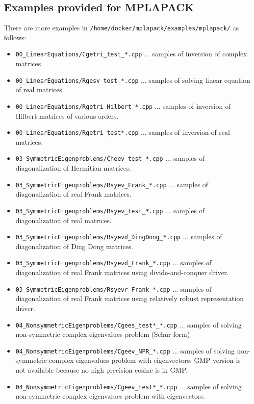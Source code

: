 \documentclass[12pt]{article}
\begin{document}
\subsection{Examples provided for MPLAPACK}
There are more examples in {\tt /home/docker/mplapack/examples/mplapack/} as follows:
\begin{itemize}
\item {\tt 00\_LinearEquations/Cgetri\_test\_*.cpp} ... samples of inversion of complex matrices
\item {\tt 00\_LinearEquations/Rgesv\_test\_*.cpp} ... samples of solving linear equation of real matrices
\item {\tt 00\_LinearEquations/Rgetri\_Hilbert\_*.cpp} ... samples of inversion of Hilbert matrices of various orders.
\item {\tt 00\_LinearEquations/Rgetri\_test*.cpp} ... samples of inversion of real matrices.
\item {\tt 03\_SymmetricEigenproblems/Cheev\_test\_*.cpp} ... samples of diagonalization of Hermitian matrices.
\item {\tt 03\_SymmetricEigenproblems/Rsyev\_Frank\_*.cpp} ... samples of diagonalization of real Frank matrices.
\item {\tt 03\_SymmetricEigenproblems/Rsyev\_test\_*.cpp} ... samples of diagonalization of real matrices.
\item {\tt 03\_SymmetricEigenproblems/Rsyevd\_DingDong\_*.cpp} ... samples of diagonalization of Ding Dong matrices.
\item {\tt 03\_SymmetricEigenproblems/Rsyevd\_Frank\_*.cpp} ... samples of diagonalization of real Frank matrices using divide-and-conquer driver.
\item {\tt 03\_SymmetricEigenproblems/Rsyevr\_Frank\_*.cpp}  ... samples of diagonalization of real Frank matrices using relatively robust representation driver.
\item {\tt 04\_NonsymmetricEigenproblems/Cgees\_test*_*.cpp} ... samples of solving non-symmetric complex eigenvalues problem (Schur form)

\item {\tt 04\_NonsymmetricEigenproblems/Cgeev\_NPR\_*.cpp} ... samples of solving non-symmetric complex eigenvalues problem with eigenvectors; GMP version is not available because no high precision cosine is in GMP.

\item {\tt 04\_NonsymmetricEigenproblems/Cgeev\_test*\_*.cpp} ... samples of solving non-symmetric complex eigenvalues problem with eigenvectors.


\end{itemize}
\end{document}

